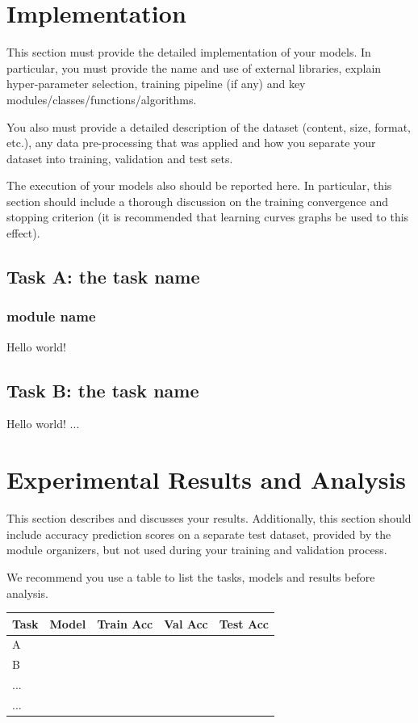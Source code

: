 \documentclass{article}
\begin{document}
\section{Implementation}
\label{sec:impl}
    This section must provide the detailed implementation of your models. In particular, you must provide the name and use of external libraries, explain hyper-parameter selection, training pipeline (if any) and key modules/classes/functions/algorithms.
    
    You also must provide a detailed description of the dataset (content, size, format, etc.), any data pre-processing that was applied and how you separate your dataset into training, validation and test sets.
    
    The execution of your models also should be reported here. In particular, this section should include a thorough discussion on the training convergence and stopping criterion (it is recommended that learning curves graphs be used to this effect).

    \subsection{Task A: the task name}
    \label{ssec:imp_models_A1}
    \subsubsection{module name}
    Hello world!
    \subsection{Task B: the task name}
    \label{ssec:imp_models_B}
    Hello world! ...
    

\section{Experimental Results and Analysis}
\label{sec:results}
    This section describes and discusses your results. Additionally, this section should include accuracy prediction scores on a separate test dataset, provided by the module organizers, but not used during your training and validation process.
    
    We recommend you use a table to list the tasks, models and results before analysis.
    

    \begin{table}[]
    \label{table:Table1}
    \begin{tabular}{@{}lllll@{}}
    \toprule
    Task & Model & Train Acc & Val Acc & Test Acc \\ \midrule
    A   &       &           &         &          \\
    B   &       &           &         &          \\
    ...   &       &           &         &          \\
    ...   &       &           &         &          \\ \bottomrule
    \end{tabular}
    \end{table}
\end{document}
